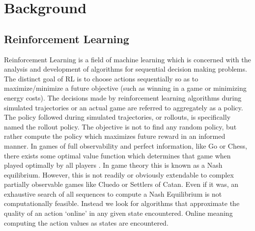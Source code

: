 \documentclass[msc, deptreport, ai, romanprepages]{infthesis}
\begin{document}
\chapter{Background}
\section{Reinforcement Learning}
Reinforcement Learning is a field of machine learning which is concerned with the analysis and development of algorithms for sequential decision making problems. The distinct goal of RL is to choose actions sequentially so as to maximize/minimize a future objective (such as winning in a game or minimizing energy costs). The decisions made by reinforcement learning algorithms during simulated trajectories or an actual game are referred to aggregately as a policy. The policy followed during simulated trajectories, or rollouts, is specifically named the rollout policy. The objective is not to find any random policy, but rather compute the policy which maximizes future reward in an informed manner. In games of full observability and perfect information, like Go or Chess, there exists some optimal value function which determines that game when played optimally by all players \cite{Silver2016}. In game theory this is known as a Nash equilibrium. However, this is not readily or obviously extendable to complex partially observable games like Cluedo or Settlers of Catan. Even if it was, an exhaustive search of all sequences to compute a Nash Equilibrium is not computationally feasible. Instead we look for algorithms that approximate the quality of an action ‘online’ in any given state encountered. Online meaning computing the action values as states are encountered. 
\end{document}
